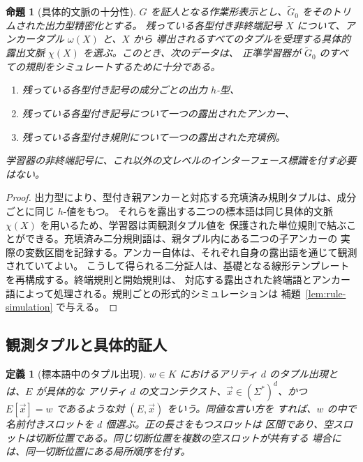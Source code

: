 \documentclass[11pt,a4paper]{ltjsarticle}
\newtheorem{proposition}[theorem]{命題}
\newtheorem{definition}[theorem]{定義}
\theoremstyle{remark}
\newcommand{\tuple}[1]{\vec{#1}}
\begin{document}
\begin{proposition}[具体的文脈の十分性]
\label{prop:concrete-context-sufficiency}
\(G\) を証人となる作業形表示とし、\(\widetilde G_0\) をそのトリムされた出力型精密化とする。
残っている各型付き非終端記号 \(X\) について、アンカータプル \(\omega(X)\) と、\(X\) から
導出されるすべてのタプルを受理する具体的露出文脈 \(\chi(X)\) を選ぶ。このとき、次のデータは、
正準学習器が \(\widetilde G_0\) のすべての規則をシミュレートするために十分である。
\begin{enumerate}[label=(\roman*),leftmargin=*]
\item 残っている各型付き記号の成分ごとの出力 \(h\)-型、
\item 残っている各型付き記号について一つの露出されたアンカー、
\item 残っている各型付き規則について一つの露出された充填例。
\end{enumerate}
学習器の非終端記号に、これ以外の文レベルのインターフェース標識を付す必要はない。
\end{proposition}

\begin{proof}
出力型により、型付き親アンカーと対応する充填済み規則タプルは、成分ごとに同じ \(h\)-値をもつ。
それらを露出する二つの標本語は同じ具体的文脈 \(\chi(X)\) を用いるため、学習器は両観測タプル値を
保護された単位規則で結ぶことができる。充填済み二分規則語は、親タプル内にある二つの子アンカーの
実際の変数区間を記録する。アンカー自体は、それぞれ自身の露出語を通じて観測されていてよい。
こうして得られる二分証人は、基礎となる線形テンプレートを再構成する。終端規則と開始規則は、
対応する露出された終端語とアンカー語によって処理される。規則ごとの形式的シミュレーションは
補題~\ref{lem:rule-simulation} で与える。
\end{proof}

\subsection{観測タプルと具体的証人}

\begin{definition}[標本語中のタプル出現]
\label{def:tuple-occurrence}
\(w\in K\) におけるアリティ \(d\) のタプル出現とは、\(E\) が具体的な
アリティ \(d\) の文コンテクスト、\(\tuple x\in(\Sigma^*)^d\)、かつ
\(E[\tuple x]=w\) であるような対 \((E,\tuple x)\) をいう。同値な言い方を
すれば、\(w\) の中で名前付きスロットを \(d\) 個選ぶ。正の長さをもつスロットは
区間であり、空スロットは切断位置である。同じ切断位置を複数の空スロットが共有する
場合には、同一切断位置にある局所順序を付す。
\end{definition}
\end{document}
